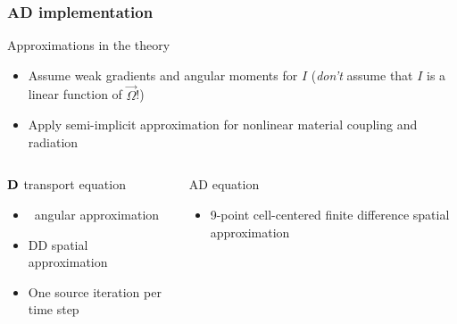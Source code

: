 \documentclass{beamer}
\begin{document}
\begin{frame}
  \frametitle{AD implementation}
  \begin{block}{Approximations in the theory}
    \begin{itemize}
      \item Assume weak gradients and angular moments for $I$ (\emph{don't}
        assume that $I$ is a linear function of $\vec{\Omega}$!)
      \item Apply semi-implicit approximation for nonlinear material coupling
        and radiation
    \end{itemize}
  \end{block}
  \vspace{-\baselineskip}
  \begin{columns}[t]
    \begin{column}{.48\textwidth}
\begin{block}{$\mathbf{D}$ transport equation}
  \begin{itemize}
    \item \SN\ angular approximation
    \item DD spatial approximation
    \item One source iteration per time step
  \end{itemize}
\end{block}
    \end{column}
    \begin{column}{.48\textwidth}
\begin{block}{AD equation}
  \begin{itemize}
    \item 9-point cell-centered finite difference spatial approximation
  \end{itemize}
\end{block}
    \end{column}
  \end{columns}
\end{frame}

\end{document}
